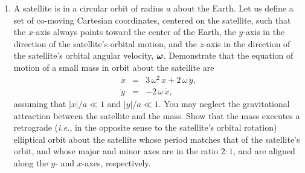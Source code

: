 {\begin{enumerate}
\item A satellite is in a circular orbit of radius $a$ about the Earth.
Let us define a set of co-moving Cartesian coordinates, centered on the satellite, such that
the $x$-axis always points toward the center of the Earth, the $y$-axis in the
direction of the satellite's orbital motion, and the $z$-axis in the direction
of the satellite's orbital angular velocity, $\mbox{\boldmath$\omega$}$. Demonstrate that the
equation of motion of a small mass in orbit about the satellite are
\begin{eqnarray}
\ddot{x} &=& 3\,\omega^2\,x + 2\,\omega\,\dot{y},\nonumber\\[0.5ex]
\ddot{y} &=& -2\,\omega\,\dot{x},\nonumber
\end{eqnarray}
assuming that $|x|/a\ll 1$ and $|y|/a\ll 1$. You may neglect the gravitational
attraction between the satellite and the mass.
Show that the mass
executes a retrograde ({\em i.e.}, in the opposite sense to the
satellite's orbital rotation)  elliptical orbit about the satellite whose 
period matches that of the satellite's orbit, and whose major and minor axes
are in the ratio $2:1$, and are  aligned along the $y$- and $x$-axes,
respectively. 
\end{enumerate}

}